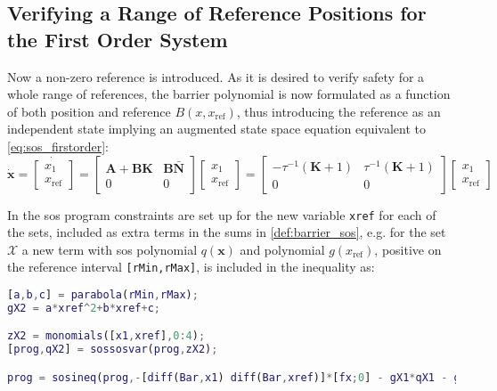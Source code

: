 \subsection{Verifying a Range of Reference Positions for the First Order System}\label{sec:sos_1storder_references}

\vspace{-2mm}
Now a non-zero reference is introduced. As it is desired to verify safety for a whole range of references, the barrier polynomial is now formulated as a function of both position and reference $B(x,x_\text{ref})$, thus introducing the reference as an independent state implying an augmented state space equation equivalent to \autoref{eq:sos_firstorder}: 
\begin{equation}
\dot{\mathbf{x}}=\dot{\begin{bmatrix}
x_1\\x_\text{ref}
\end{bmatrix}} 
= \begin{bmatrix}
\mathbf{A}+\textbf{BK} & \textbf{B}\bar{\mathbf{N}}\\
0 & 0
\end{bmatrix}
\begin{bmatrix}
x_1\\x_\text{ref}
\end{bmatrix}
= \begin{bmatrix}
-\tau^{-1}(\mathbf{K}+1) & \tau^{-1}(\mathbf{K}+1)\\
0 & 0
\end{bmatrix}
\begin{bmatrix}
x_1\\x_\text{ref}
\end{bmatrix}
\label{eq:1storder_augmented}
\end{equation}

In the \gls{sos} program constraints are set up for the new variable \texttt{xref}  for each of the sets, included as extra terms in the sums in \autoref{def:barrier_sos}, e.g. for the set $\mathcal{X}$ a new term with \gls{sos} polynomial $q(\mathbf{x})$ and polynomial $g(x_\text{ref})$, positive on the  reference  interval \texttt{[rMin,rMax]}, is included in the inequality as:
\begin{lstlisting}[language=matlab]
% Constraint on the set X being nonpositive for the interval of references 
[a,b,c] = parabola(rMin,rMax); 
gX2 = a*xref^2+b*xref+c;

zX2 = monomials([x1,xref],0:4);
[prog,qX2] = sossosvar(prog,zX2);

prog = sosineq(prog,-[diff(Bar,x1) diff(Bar,xref)]*[fx;0] - gX1*qX1 - gX2*qX2);
\end{lstlisting}

